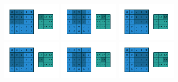 \begin{figure}
     \begin{subfigure}[b]{0.6\textwidth}
        \centering
        \includegraphics[width=0.32\textwidth]{chapters/assets/avg-pooling/numerical_average_pooling_00.pdf}
        \includegraphics[width=0.32\textwidth]{chapters/assets/avg-pooling/numerical_average_pooling_01.pdf}
        \includegraphics[width=0.32\textwidth]{chapters/assets/avg-pooling/numerical_average_pooling_02.pdf}
        \includegraphics[width=0.32\textwidth]{chapters/assets/avg-pooling/numerical_average_pooling_03.pdf}
        \includegraphics[width=0.32\textwidth]{chapters/assets/avg-pooling/numerical_average_pooling_04.pdf}
        \includegraphics[width=0.32\textwidth]{chapters/assets/avg-pooling/numerical_average_pooling_05.pdf}

\end{subfigure}
\end{figure}
